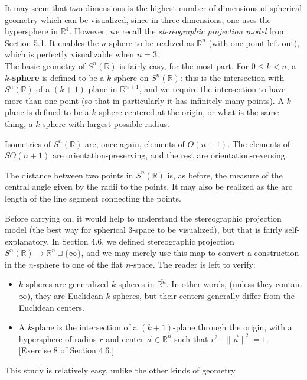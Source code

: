 \documentclass[leqno]{book}
\begin{document}
It may seem that two dimensions is the highest number of dimensions of spherical geometry which can be visualized, since in three dimensions, one uses the hypersphere in $\mathbb R^4$.  However, we recall the \emph{stereographic projection model} from Section 5.1.  It enables the $n$-sphere to be realized as $\mathbb R^n$ (with one point left out), which is perfectly visualizable when $n=3$.\\

\noindent The basic geometry of $S^n(\mathbb R)$ is fairly easy, for the most part.  For $0\leqslant k<n$, a \textbf{$k$-sphere} is defined to be a $k$-sphere on $S^n(\mathbb R)$: this is the intersection with $S^n(\mathbb R)$ of a $(k+1)$-plane in $\mathbb R^{n+1}$, and we require the intersection to have more than one point (so that in particularly it has infinitely many points).  A $k$-plane is defined to be a $k$-sphere centered at the origin, or what is the same thing, a $k$-sphere with largest possible radius.

Isometries of $S^n(\mathbb R)$ are, once again, elements of $O(n+1)$.  The elements of $SO(n+1)$ are orientation-preserving, and the rest are orientation-reversing.

The distance between two points in $S^n(\mathbb R)$ is, as before, the measure of the central angle given by the radii to the points.  It may also be realized as the arc length of the line segment connecting the points.

Before carrying on, it would help to understand the stereographic projection model (the best way for spherical 3-space to be visualized), but that is fairly self-explanatory.  In Section 4.6, we defined stereographic projection $S^n(\mathbb R)\to\mathbb R^n\sqcup\{\infty\}$, and we may merely use this map to convert a construction in the $n$-sphere to one of the flat $n$-space.  The reader is left to verify:
\begin{itemize}
\item $k$-spheres are generalized $k$-spheres in $\overline{\mathbb R^n}$.  In other words, (unless they contain $\infty$), they are Euclidean $k$-spheres, but their centers generally differ from the Euclidean centers.

\item A $k$-plane is the intersection of a $(k+1)$-plane through the origin, with a hypersphere of radius $r$ and center $\vec a\in\mathbb R^n$ such that $r^2-\|\vec a\|^2=1$. [Exercise 8 of Section 4.6.]
\end{itemize}
This study is relatively easy, unlike the other kinds of geometry.\\
\end{document}
